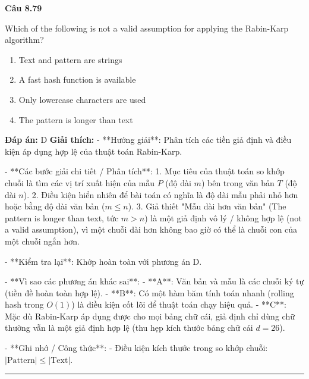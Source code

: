 \documentclass[11pt,a4paper]{article}
\newenvironment{question}[1]{%
  \par\vspace{1em}\noindent\textbf{\large Câu #1}\par\vspace{0.4em}
}{%
  \par\vspace{1em}\hrule\vspace{0.6em}
}
\newenvironment{choices}{%
  \begin{enumerate}[label=\textbf{\Alph*.},leftmargin=2.2em,itemsep=2pt,topsep=3pt]
}{%
  \end{enumerate}
}
\newcommand{\choice}{\item}
\begin{document}
\begin{question}{8.79}
Which of the following is not a valid assumption for applying the Rabin-Karp algorithm?
\begin{choices}
\choice Text and pattern are strings
\choice A fast hash function is available
\choice Only lowercase characters are used
\choice The pattern is longer than text
\end{choices}
\textbf{Đáp án:} D
\textbf{Giải thích:} - **Hướng giải**:
  Phân tích các tiền giả định và điều kiện áp dụng hợp lệ của thuật toán Rabin-Karp.

- **Các bước giải chi tiết / Phân tích**:
  1. Mục tiêu của thuật toán so khớp chuỗi là tìm các vị trí xuất hiện của mẫu \(P\) (độ dài \(m\)) bên trong văn bản \(T\) (độ dài \(n\)).
  2. Điều kiện hiển nhiên để bài toán có nghĩa là độ dài mẫu phải nhỏ hơn hoặc bằng độ dài văn bản (\(m \le n\)).
  3. Giả thiết "Mẫu dài hơn văn bản" (The pattern is longer than text, tức \(m > n\)) là một giả định vô lý / không hợp lệ (not a valid assumption), vì một chuỗi dài hơn không bao giờ có thể là chuỗi con của một chuỗi ngắn hơn.

- **Kiểm tra lại**:
  Khớp hoàn toàn với phương án D.

- **Vì sao các phương án khác sai**:
  - **A**: Văn bản và mẫu là các chuỗi ký tự (tiền đề hoàn toàn hợp lệ).
  - **B**: Có một hàm băm tính toán nhanh (rolling hash trong \(O(1)\)) là điều kiện cốt lõi để thuật toán chạy hiệu quả.
  - **C**: Mặc dù Rabin-Karp áp dụng được cho mọi bảng chữ cái, giả định chỉ dùng chữ thường vẫn là một giả định hợp lệ (thu hẹp kích thước bảng chữ cái \(d = 26\)).

- **Ghi nhớ / Công thức**:
  - Điều kiện kích thước trong so khớp chuỗi: \(|\text{Pattern}| \le |\text{Text}|\).
\end{question}
\end{document}
